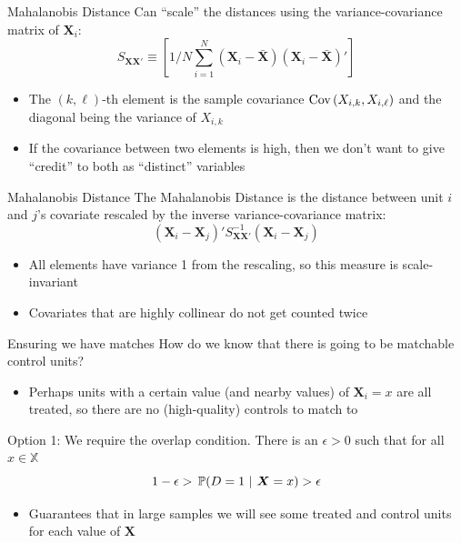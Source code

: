 \documentclass[aspectratio=169,t,11pt,table]{beamer}
\begin{document}
\begin{frame}{Mahalanobis Distance}
  Can ``scale'' the distances using the variance-covariance matrix of $\bm{X}_i$:
  $$
    S_{\bm{X}\bm{X}'} \equiv \left[ 1/N \sum_{i=1}^N (\bm{X}_i - \bar{\bm{X}}) (\bm{X}_i - \bar{\bm{X}})' \right]
  $$
  \begin{itemize}
    \item The $(k, \ell)$-th element is the sample covariance $\cov{X_{i, k}, X_{i, \ell}}$ and the diagonal being the variance of $X_{i, k}$
    
    \item If the covariance between two elements is high, then we don't want to give ``credit'' to both as ``distinct'' variables
  \end{itemize}
\end{frame}

\begin{frame}{Mahalanobis Distance}
  The \alert{Mahalanobis Distance} is the distance between unit $i$ and $j$'s covariate rescaled by the inverse variance-covariance matrix:
  $$
    (\bm{X}_i - \bm{X}_j)' S_{\bm{X}\bm{X}'}^{-1} (\bm{X}_i - \bm{X}_j)
  $$
  \begin{itemize}
    \item All elements have variance 1 from the rescaling, so this measure is scale-invariant
    
    \item Covariates that are highly collinear do not get counted twice
    
  \end{itemize}
\end{frame}


\begin{frame}{Ensuring we have matches}
  How do we know that there is going to be matchable control units?
  \begin{itemize}
    \item Perhaps units with a certain value (and nearby values) of $\bm{X}_i = x$ are all treated, so there are no (high-quality) controls to match to
  \end{itemize}

  \pause
  \bigskip
  Option 1: We require the \alert{overlap} condition. There is an $\epsilon > 0$ such that for all $x \in \mathbb{X}$
  $$
    1 - \epsilon > \prob{D = 1}{\bm{X} = x} > \epsilon
  $$
  \begin{itemize}
    \item Guarantees that in large samples we will see some treated and control units for each value of $\bm{X}$
  \end{itemize}
\end{frame}
\end{document}
